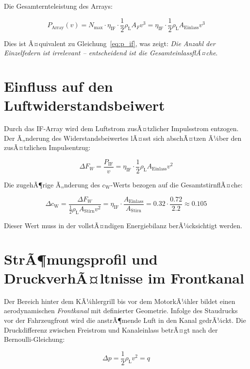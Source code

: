 ﻿\documentclass[12pt, a4paper]{report}
\theoremstyle{definition}
\theoremstyle{remark}
\newcommand{\rhoL}{\rho_{\text{L}}}
\newcommand{\cW}{c_{\text{W}}}
\newcommand{\Astirnfl}{A_{\text{Stirn}}}
\newcommand{\Aeinlass}{A_{\text{Einlass}}}
\begin{document}
Die Gesamternteleistung des Arrays:

\begin{equation}
  P_{\text{Array}}(v) = N_{\text{max}} \cdot \eta_{\text{IF}} \cdot \frac{1}{2}\rhoL A_F v^3
  = \eta_{\text{IF}} \cdot \frac{1}{2}\rhoL \Aeinlass v^3
  \label{eq:p_array}
\end{equation}

Dies ist Ã¤quivalent zu Gleichung~\eqref{eq:p_if}, was zeigt: \emph{Die Anzahl
der Einzelfedern ist irrelevant -- entscheidend ist die GesamteinlassflÃ¤che}.

\section{Einfluss auf den Luftwiderstandsbeiwert}

Durch das IF-Array wird dem Luftstrom zusÃ¤tzlicher Impulsstrom entzogen.
Der Ã„nderung des Widerstandsbeiwertes lÃ¤sst sich abschÃ¤tzen Ã¼ber den
zusÃ¤tzlichen Impulsentzug:

\begin{equation}
  \Delta F_W = \frac{P_{\text{IF}}}{v} = \eta_{\text{IF}} \cdot \frac{1}{2}\rhoL \Aeinlass v^2
  \label{eq:delta_fw}
\end{equation}

Die zugehÃ¶rige Ã„nderung des $\cW$-Werts bezogen auf die GesamtstirnflÃ¤che:

\begin{equation}
  \Delta \cW = \frac{\Delta F_W}{\frac{1}{2}\rhoL \Astirnfl v^2}
  = \eta_{\text{IF}} \cdot \frac{\Aeinlass}{\Astirnfl}
  = 0.32 \cdot \frac{0.72}{2.2} \approx 0.105
  \label{eq:delta_cw}
\end{equation}

Dieser Wert muss in der vollstÃ¤ndigen Energiebilanz berÃ¼cksichtigt werden.

\section{StrÃ¶mungsprofil und DruckverhÃ¤ltnisse im Frontkanal}
\label{sec:kfz_kanal}

Der Bereich hinter dem KÃ¼hlergrill bis vor dem MotorkÃ¼hler bildet einen
aerodynamischen \emph{Frontkanal} mit definierter Geometrie. Infolge des
Staudrucks vor der Fahrzeugfront wird die anstrÃ¶mende Luft in den Kanal
gedrÃ¼ckt. Die Druckdifferenz zwischen Freistrom und Kanaleinlass betrÃ¤gt
nach der Bernoulli-Gleichung:

\begin{equation}
  \Delta p = \frac{1}{2}\rhoL v^2 = q
  \label{eq:staudruck_kanal}
\end{equation}
\end{document}
